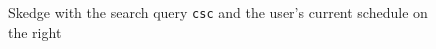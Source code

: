 \begin{figure}[ht]
    \centering
    \caption[Skedge with the search query {\tt csc}]{Skedge with the search query {\tt csc} and the user's current schedule on the right}
    \label{fig:sk-index}
\end{figure}